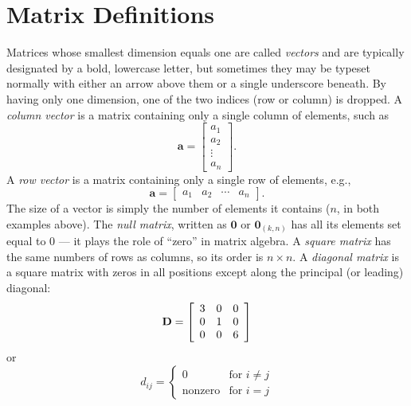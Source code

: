 \section{Matrix Definitions}

Matrices whose smallest dimension equals one are called \emph{vectors} and are typically designated
by a bold, lowercase letter, but sometimes they may be typeset normally with either an
arrow above them or a single underscore beneath. By having only one dimension, one of the two indices (row or column) is dropped.
A \emph{column vector} is a matrix containing only a single column of elements, such as
\begin{equation}
\mathbf{a} = \left[ \begin{array}{c}
a_1\\
a_2\\
\vdots\\
a_n
\end{array}  \right] . 
\end{equation}
\noindent
A \emph{row vector} is a matrix containing only a single row of elements, e.g.,
\begin{equation}
\mathbf{a} = \left[ \begin{array}{cccc}
a_1 & a_2 & \cdots & a_n
\end{array}  \right] .
\end{equation}
The size of a vector is simply the number of elements it contains ($n$, in both examples above).
The \emph{null matrix}, written as $\mathbf{0}$ or $\mathbf{0}_{(k,n)}$ has all its elements set equal to 0 --- it plays the
role of ``zero'' in matrix algebra.
A \emph{square matrix} has the same numbers of rows as columns, so its order is $n \times n$.
A \emph{diagonal matrix} is a square matrix with zeros in all positions except along the principal (or 
leading) diagonal:
\begin{equation}
	\index{Diagonal matrix}
	\index{Matrix!diagonal}
\mathbf{D} = \left[ 
\begin{array}{ccc}
3 & 0 & 0 \\
0 & 1 & 0\\
0 & 0 & 6
\end{array} \right]	 
\end{equation}
or
\begin{equation}
d_{ij} = \left \{ \begin{array}{cl}
0 & \mbox{for } i \neq j\\
\mbox{nonzero} & \mbox{for } i = j 
\end{array} \right.
\end{equation}	 
